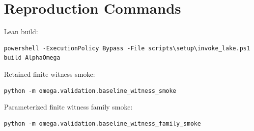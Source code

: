 \documentclass[11pt]{article}
\begin{document}
\section{Reproduction Commands}

Lean build:

\begin{verbatim}
powershell -ExecutionPolicy Bypass -File scripts\setup\invoke_lake.ps1 build AlphaOmega
\end{verbatim}

Retained finite witness smoke:

\begin{verbatim}
python -m omega.validation.baseline_witness_smoke
\end{verbatim}

Parameterized finite witness family smoke:

\begin{verbatim}
python -m omega.validation.baseline_witness_family_smoke
\end{verbatim}
\end{document}

